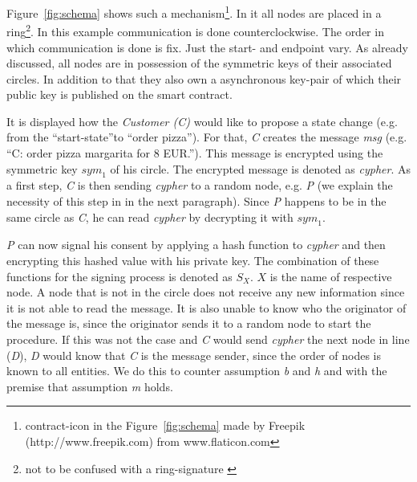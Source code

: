 \documentclass[runningheads]{llncs}
\newcommand{\comment}[1]{}
\newcommand{\ber}[1]{\textit{#1}}
\newcommand{\reffig}[1]{Figure~\ref{#1}}
\newcommand{\quotel}{``}
\newcommand{\quoter}{''}
\begin{document}
\reffig{fig:schema} shows such a mechanism\footnote{contract-icon in the \reffig{fig:schema} made by Freepik (http://www.freepik.com) from www.flaticon.com}. In it all nodes are placed in a ring\footnote{not to be confused with a ring-signature \cite{rivest2001leak}}. In this example communication is done counterclockwise. The order in which communication is done is fix. Just the start- and endpoint vary. As already discussed, all nodes are in possession of the symmetric keys of their associated circles. In addition to that they also own a asynchronous key-pair of which their public key is published on the smart contract.

It is displayed how the \ber{Customer (C)} would like to propose a state change (e.g. from the \quotel start-state\quoter  to \quotel order pizza\quoter ). For that, \ber{C} creates the message \ber{msg} (e.g. \quotel C: order pizza margarita for 8 EUR.\quoter ). This message is encrypted using the symmetric key ${sym}_1$ of his circle. The encrypted message is denoted as \ber{cypher}. As a first step, \ber{C} is then sending \ber{cypher} to a random node, e.g. \ber{P} (we explain the necessity of this step in in the next paragraph). Since \ber{P} happens to be in the same circle as \ber{C}, he can read \ber{cypher} by decrypting it with ${sym}_1$. 



\ber{P} can now signal his consent by applying a hash function to \ber{cypher} and then encrypting this hashed value with his private key. The combination of these functions for the signing process is denoted as $S_X$. $X$ is the name of respective node. A node that is not in the circle does not receive any new information since it is not able to read the message. It is also unable to know who the originator of the message is, since the originator sends it to a random node to start the procedure. If this was not the case and \ber{C} would send \ber{cypher} the next node in line (\ber{D}), \ber{D} would know that \ber{C} is the message sender, since the order of nodes is known to all entities. We do this to counter assumption \ber{b} and \ber{h} and with the premise that assumption \ber{m} holds.

\comment{
Furthermore, a node will also not be able to know how many other nodes already \quotel agreed\quoter  to the message, because we \quotel nest\quoter  signatures instead of just appending them to a list. This way it is impossible to simply count the number of signatures, send together with \ber{cypher}. We do all of this to counter assumption \ber{b} and \ber{h} and with the premise that assumption \ber{m} holds.
}
\end{document}
